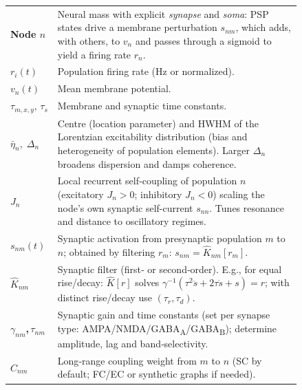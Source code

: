 \documentclass[11pt]{article}
\numberwithin{equation}{section}
\newcommand{\rev}[1]{\begingroup\color{black}#1\endgroup}
\begin{document}
\begin{tcolorbox}[
  colback=gray!5,
  colframe=slate,
  colbacktitle=softblue!25,
  coltitle=softblue!60!black,
  fonttitle=\bfseries\small,
  title={
  \small \textit{NMM2  Network (Eq.~\ref{eq:nmm2-general})} \\ Whole-brain Simulations Parameters \& Physiological Meaning
  },
  boxrule=0.4pt, enhanced, sharp corners,
  left=4pt,right=4pt,top=3pt,bottom=3pt,
  boxsep=2pt, before skip=6pt, after skip=6pt
]
\scriptsize
\begin{tabular}{@{}l p{0.84\linewidth}@{}}
\textbf{Node $n$} & Neural mass with explicit \emph{synapse} and \emph{soma}: PSP states drive a membrane perturbation $s_{nm}$, which adds, with others, to $v_n$ and passes through a sigmoid to yield a firing rate $r_n$.\\
\textbf{$r_i(t)$}  & Population firing rate (Hz or normalized).  \\
\textbf{$v_n(t)$} & Mean membrane potential. \\
{$\tau_{m,x,y},\,  \tau_s$} &  Membrane and synaptic time constants. \\
\textbf{$\bar\eta_n,\;\Delta_n$} & \rev{Centre (location parameter) and HWHM} of the Lorentzian excitability distribution (bias and heterogeneity of population elements). Larger $\Delta_n$ broadens dispersion and damps coherence.\\
\textbf{$J_n$} & Local recurrent self‑coupling of population $n$ (excitatory $J_n\!>\!0$; inhibitory $J_n\!<\!0$) scaling the node’s own synaptic self-current $s_{nn}$. Tunes resonance and distance to oscillatory regimes.\\
\textbf{$s_{nm}(t)$} & Synaptic activation from presynaptic population $m$ to $n$; obtained by filtering $r_m$: $s_{nm}=\hat K_{nm}[r_m]$.\\
\textbf{$\hat K_{nm}$} & Synaptic filter (first‑ or second‑order). E.g., for equal rise/decay: $\hat K[r]$ solves $\gamma^{-1}(\tau^2\ddot s+2\tau\dot s+s)=r$; with distinct rise/decay use $(\tau_r,\tau_d)$.\\
\textbf{$\gamma_{nm}$,\,$\tau_{nm}$} & Synaptic gain and time constants (set per synapse type: AMPA/NMDA/GABA\textsubscript{A}/GABA\textsubscript{B}); determine amplitude, lag and band‑selectivity.\\
\textbf{$C_{nm}$} & Long‑range coupling weight from $m$ to $n$ (SC by default; FC/EC or synthetic graphs if needed).\\

\end{tabular}
\end{tcolorbox}
\end{document}

